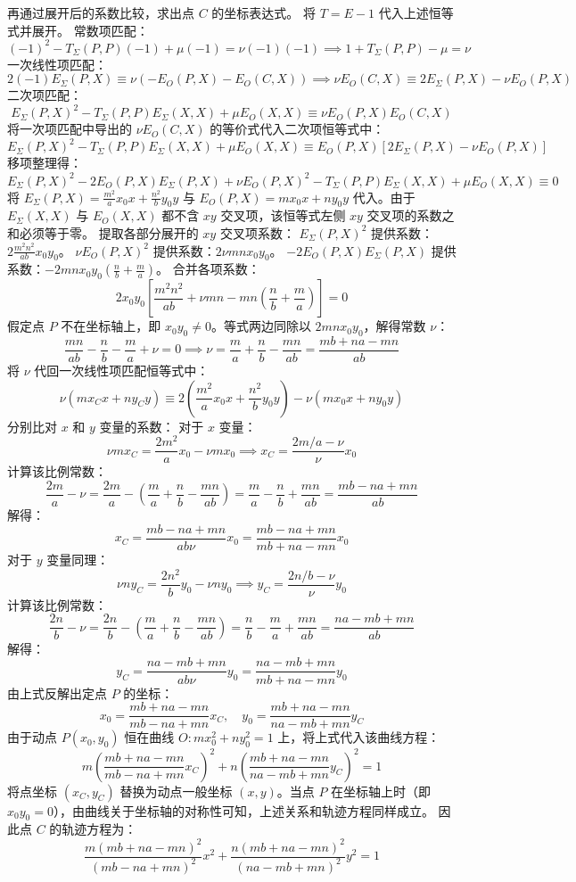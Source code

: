 \begin{solution}
再通过展开后的系数比较，求出点 $C$ 的坐标表达式。
将 $T = E - 1$ 代入上述恒等式并展开。
常数项匹配：
\[ (-1)^2 - T_{\Sigma}(P, P)(-1) + \mu(-1) = \nu(-1)(-1) \implies 1 + T_{\Sigma}(P, P) - \mu = \nu \]
一次线性项匹配：
\[ 2(-1)E_{\Sigma}(P, X) \equiv \nu(-E_O(P, X) - E_O(C, X)) \implies \nu E_O(C, X) \equiv 2E_{\Sigma}(P, X) - \nu E_O(P, X) \]
二次项匹配：
\[ E_{\Sigma}(P, X)^2 - T_{\Sigma}(P, P) E_{\Sigma}(X, X) + \mu E_O(X, X) \equiv \nu E_O(P, X) E_O(C, X) \]
将一次项匹配中导出的 $\nu E_O(C, X)$ 的等价式代入二次项恒等式中：
\[ E_{\Sigma}(P, X)^2 - T_{\Sigma}(P, P) E_{\Sigma}(X, X) + \mu E_O(X, X) \equiv E_O(P, X) [ 2E_{\Sigma}(P, X) - \nu E_O(P, X) ] \]
移项整理得：
\[ E_{\Sigma}(P, X)^2 - 2E_O(P, X) E_{\Sigma}(P, X) + \nu E_O(P, X)^2 - T_{\Sigma}(P, P) E_{\Sigma}(X, X) + \mu E_O(X, X) \equiv 0 \]
将 $E_{\Sigma}(P, X) = \frac{m^2}{a} x_0 x + \frac{n^2}{b} y_0 y$ 与 $E_O(P, X) = m x_0 x + n y_0 y$ 代入。由于 $E_{\Sigma}(X, X)$ 与 $E_O(X, X)$ 都不含 $xy$ 交叉项，该恒等式左侧 $xy$ 交叉项的系数之和必须等于零。
提取各部分展开的 $xy$ 交叉项系数：
$E_{\Sigma}(P, X)^2$ 提供系数：$2 \frac{m^2 n^2}{a b} x_0 y_0$。
$\nu E_O(P, X)^2$ 提供系数：$2 \nu m n x_0 y_0$。
$-2 E_O(P, X) E_{\Sigma}(P, X)$ 提供系数：$-2 m n x_0 y_0 \left( \frac{n}{b} + \frac{m}{a} \right)$。
合并各项系数：
\[ 2 x_0 y_0 \left[ \frac{m^2 n^2}{a b} + \nu m n - m n \left( \frac{n}{b} + \frac{m}{a} \right) \right] = 0 \]
假定点 $P$ 不在坐标轴上，即 $x_0 y_0 \neq 0$。等式两边同除以 $2mn x_0 y_0$，解得常数 $\nu$：
\[ \frac{mn}{ab} - \frac{n}{b} - \frac{m}{a} + \nu = 0 \implies \nu = \frac{m}{a} + \frac{n}{b} - \frac{mn}{ab} = \frac{mb + na - mn}{ab} \]
将 $\nu$ 代回一次线性项匹配恒等式中：
\[ \nu (m x_C x + n y_C y) \equiv 2 \left( \frac{m^2}{a} x_0 x + \frac{n^2}{b} y_0 y \right) - \nu (m x_0 x + n y_0 y) \]
分别比对 $x$ 和 $y$ 变量的系数：
对于 $x$ 变量：
\[ \nu m x_C = \frac{2m^2}{a} x_0 - \nu m x_0 \implies x_C = \frac{2m/a - \nu}{\nu} x_0 \]
计算该比例常数：
\[ \frac{2m}{a} - \nu = \frac{2m}{a} - \left( \frac{m}{a} + \frac{n}{b} - \frac{mn}{ab} \right) = \frac{m}{a} - \frac{n}{b} + \frac{mn}{ab} = \frac{mb - na + mn}{ab} \]
解得：
\[ x_C = \frac{mb - na + mn}{ab \nu} x_0 = \frac{mb - na + mn}{mb + na - mn} x_0 \]
对于 $y$ 变量同理：
\[ \nu n y_C = \frac{2n^2}{b} y_0 - \nu n y_0 \implies y_C = \frac{2n/b - \nu}{\nu} y_0 \]
计算该比例常数：
\[ \frac{2n}{b} - \nu = \frac{2n}{b} - \left( \frac{m}{a} + \frac{n}{b} - \frac{mn}{ab} \right) = \frac{n}{b} - \frac{m}{a} + \frac{mn}{ab} = \frac{na - mb + mn}{ab} \]
解得：
\[ y_C = \frac{na - mb + mn}{ab \nu} y_0 = \frac{na - mb + mn}{mb + na - mn} y_0 \]
由上式反解出定点 $P$ 的坐标：
\[ x_0 = \frac{mb + na - mn}{mb - na + mn} x_C, \quad y_0 = \frac{mb + na - mn}{na - mb + mn} y_C \]
由于动点 $P(x_0, y_0)$ 恒在曲线 $O: m x_0^2 + n y_0^2 = 1$ 上，将上式代入该曲线方程：
\[ m \left( \frac{mb + na - mn}{mb - na + mn} x_C \right)^2 + n \left( \frac{mb + na - mn}{na - mb + mn} y_C \right)^2 = 1 \]
将点坐标 $(x_C, y_C)$ 替换为动点一般坐标 $(x, y)$。当点 $P$ 在坐标轴上时（即 $x_0 y_0 = 0$），由曲线关于坐标轴的对称性可知，上述关系和轨迹方程同样成立。
因此点 $C$ 的轨迹方程为：
\[ \frac{m (mb + na - mn)^2}{(mb - na + mn)^2} x^2 + \frac{n (mb + na - mn)^2}{(na - mb + mn)^2} y^2 = 1 \]
\end{solution}



